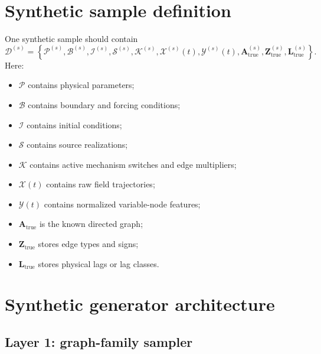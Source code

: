 \documentclass[11pt]{article}
\newcommand{\Amat}{\bm{A}}
\begin{document}
\section{Synthetic sample definition}

One synthetic sample should contain
\begin{equation}
\mathcal{D}^{(s)}=
\left
\{
\mathcal{P}^{(s)},
\mathcal{B}^{(s)},
\mathcal{I}^{(s)},
\mathcal{S}^{(s)},
\mathcal{K}^{(s)},
\mathcal{X}^{(s)}(t),
\mathcal{Y}^{(s)}(t),
\Amat_{\mathrm{true}}^{(s)},
\bm{Z}_{\mathrm{true}}^{(s)},
\bm{L}_{\mathrm{true}}^{(s)}
\right\}.
\label{eq:synthetic_sample}
\end{equation}
Here:
\begin{itemize}[leftmargin=1.5em]
    \item \(\mathcal{P}\) contains physical parameters;
    \item \(\mathcal{B}\) contains boundary and forcing conditions;
    \item \(\mathcal{I}\) contains initial conditions;
    \item \(\mathcal{S}\) contains source realizations;
    \item \(\mathcal{K}\) contains active mechanism switches and edge multipliers;
    \item \(\mathcal{X}(t)\) contains raw field trajectories;
    \item \(\mathcal{Y}(t)\) contains normalized variable-node features;
    \item \(\Amat_{\mathrm{true}}\) is the known directed graph;
    \item \(\bm{Z}_{\mathrm{true}}\) stores edge types and signs;
    \item \(\bm{L}_{\mathrm{true}}\) stores physical lags or lag classes.
\end{itemize}

\section{Synthetic generator architecture}

\subsection{Layer 1: graph-family sampler}
\end{document}
